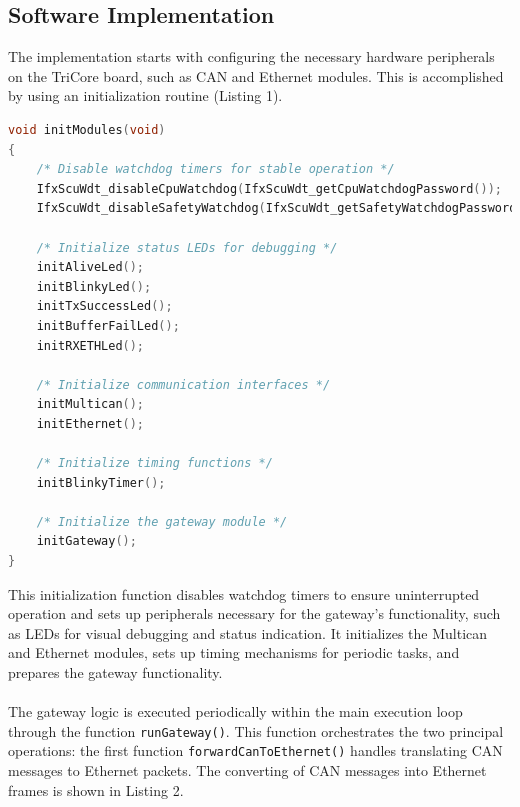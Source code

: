 \subsection{Software Implementation}
The implementation starts with configuring the necessary hardware peripherals on the TriCore board, such as CAN and Ethernet modules. This is accomplished by using an initialization routine (Listing 1).
\begin{lstlisting}[language=C, caption={Initialization of modules (Cpu0\_Main.c)}, label={lst:ini_module}]
void initModules(void)
{
    /* Disable watchdog timers for stable operation */
    IfxScuWdt_disableCpuWatchdog(IfxScuWdt_getCpuWatchdogPassword());
    IfxScuWdt_disableSafetyWatchdog(IfxScuWdt_getSafetyWatchdogPassword());

    /* Initialize status LEDs for debugging */
    initAliveLed();
    initBlinkyLed();
    initTxSuccessLed();
    initBufferFailLed();
    initRXETHLed();

    /* Initialize communication interfaces */
    initMultican();
    initEthernet();

    /* Initialize timing functions */
    initBlinkyTimer();

    /* Initialize the gateway module */
    initGateway();
}
\end{lstlisting}
This initialization function disables watchdog timers to ensure uninterrupted operation and sets up peripherals necessary for the gateway’s functionality, such as LEDs for visual debugging and status indication. It initializes the Multican and Ethernet modules, sets up timing mechanisms for periodic tasks, and prepares the gateway functionality.\\\\
The gateway logic is executed periodically within the main execution loop through the function \verb|runGateway()|. This function orchestrates the two principal operations: the first function \verb|forwardCanToEthernet()| handles translating CAN messages to Ethernet packets. The converting of CAN messages into Ethernet frames is shown in Listing 2.
